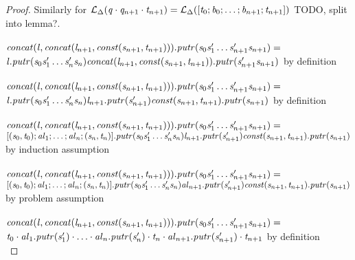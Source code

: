 \begin{lemma}
\begin{proof}
Similarly for
$\mathcal{L}_{\Delta}(\mathit{q}\cdot\mathit{q}_{n+1}\cdot\mathit{t}_{n+1})
= \mathcal{L}_{\Delta}([\mathit{t}_0;\mathit{b}_0;\ldots;\mathit{b}_{n+1};\mathit{t}_{n+1}])$
 TODO, split into lemma?.\\
\\
$\mathit{concat}(\mathit{l},\mathit{concat}(\mathit{l}_{n+1},\mathit{const}(\mathit{s}_{n+1},\mathit{t}_{n+1})))\mathit{.putr}
(\mathit{s}_0\mathit{s}_1'\ldots\mathit{s}_{n+1}'\mathit{s}_{n+1}) =$\\
$\mathit{l}\mathit{.putr}(\mathit{s}_0\mathit{s}_1'\ldots\mathit{s}_n'\mathit{s}_n)\mathit{concat}(\mathit{l}_{n+1},\mathit{const}(\mathit{s}_{n+1},\mathit{t}_{n+1}))\mathit{.putr}(\mathit{s}_{n+1}'\mathit{s}_{n+1})$ by definition\\
\\
$\mathit{concat}(\mathit{l},\mathit{concat}(\mathit{l}_{n+1},\mathit{const}(\mathit{s}_{n+1},\mathit{t}_{n+1})))\mathit{.putr}
(\mathit{s}_0\mathit{s}_1'\ldots\mathit{s}_{n+1}'\mathit{s}_{n+1}) =$\\
$\mathit{l}\mathit{.putr}(\mathit{s}_0\mathit{s}_1'\ldots\mathit{s}_n'\mathit{s}_n)\mathit{l}_{n+1}\mathit{.putr}(\mathit{s}_{n+1}')\mathit{const}(\mathit{s}_{n+1},\mathit{t}_{n+1})\mathit{.putr}(\mathit{s}_{n+1})$ by definition\\
\\
$\mathit{concat}(\mathit{l},\mathit{concat}(\mathit{l}_{n+1},\mathit{const}(\mathit{s}_{n+1},\mathit{t}_{n+1})))\mathit{.putr}
(\mathit{s}_0\mathit{s}_1'\ldots\mathit{s}_{n+1}'\mathit{s}_{n+1}) =$\\
$[(\mathit{s}_0,\mathit{t}_0);\mathit{al}_1;\ldots;\mathit{al}_n;(\mathit{s}_n,\mathit{t}_n)]\mathit{.putr}(\mathit{s}_0\mathit{s}_1'\ldots\mathit{s}_n'\mathit{s}_n)\mathit{l}_{n+1}\mathit{.putr}(\mathit{s}_{n+1}')\mathit{const}(\mathit{s}_{n+1},\mathit{t}_{n+1})\mathit{.putr}(\mathit{s}_{n+1})$ by induction assumption\\
\\
$\mathit{concat}(\mathit{l},\mathit{concat}(\mathit{l}_{n+1},\mathit{const}(\mathit{s}_{n+1},\mathit{t}_{n+1})))\mathit{.putr}
(\mathit{s}_0\mathit{s}_1'\ldots\mathit{s}_{n+1}'\mathit{s}_{n+1}) =$\\
$[(\mathit{s}_0,\mathit{t}_0);\mathit{al}_1;\ldots;\mathit{al}_n;(\mathit{s}_n,\mathit{t}_n)]\mathit{.putr}(\mathit{s}_0\mathit{s}_1'\ldots\mathit{s}_n'\mathit{s}_n)\mathit{al}_{n+1}\mathit{.putr}(\mathit{s}_{n+1}')\mathit{const}(\mathit{s}_{n+1},\mathit{t}_{n+1})\mathit{.putr}(\mathit{s}_{n+1})$ by problem assumption\\
\\
$\mathit{concat}(\mathit{l},\mathit{concat}(\mathit{l}_{n+1},\mathit{const}(\mathit{s}_{n+1},\mathit{t}_{n+1})))\mathit{.putr}
(\mathit{s}_0\mathit{s}_1'\ldots\mathit{s}_{n+1}'\mathit{s}_{n+1}) =$\\
$\mathit{t}_0\cdot\mathit{al}_1\mathit{.putr}(\mathit{s}_1')\cdot\ldots\cdot\mathit{al}_n\mathit{.putr}(\mathit{s}_n')\cdot\mathit{t}_n\cdot\mathit{al}_{n+1}\mathit{.putr}(\mathit{s}_{n+1}')\cdot\mathit{t}_{n+1}$ by definition\\

\end{proof}
\end{lemma}
